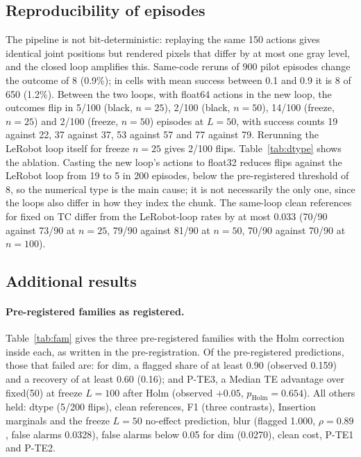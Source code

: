 \documentclass[11pt]{article}
\newcommand{\fixed}{\textsf{fixed}\xspace}
\begin{document}
\subsection{Reproducibility of episodes}\label{app:noise}
The pipeline is not bit-deterministic: replaying the same 150 actions gives identical joint positions but rendered pixels that differ by at most one gray level, and the closed loop amplifies this. Same-code reruns of 900 pilot episodes change the outcome of 8 (0.9\%); in cells with mean success between 0.1 and 0.9 it is 8 of 650 (1.2\%). Between the two loops, with float64 actions in the new loop, the outcomes flip in 5/100 (black, $n{=}25$), 2/100 (black, $n{=}50$), 14/100 (freeze, $n{=}25$) and 2/100 (freeze, $n{=}50$) episodes at $L{=}50$, with success counts 19 against 22, 37 against 37, 53 against 57 and 77 against 79. Rerunning the LeRobot loop itself for freeze $n{=}25$ gives 2/100 flips. Table~\ref{tab:dtype} shows the ablation. Casting the new loop's actions to float32 reduces flips against the LeRobot loop from 19 to 5 in 200 episodes, below the pre-registered threshold of 8, so the numerical type is the main cause; it is not necessarily the only one, since the loops also differ in how they index the chunk. The same-loop clean references for \fixed on TC differ from the LeRobot-loop rates by at most 0.033 (70/90 against 73/90 at $n{=}25$, 79/90 against 81/90 at $n{=}50$, 70/90 against 70/90 at $n{=}100$).
\begin{table}[h]
\centering\small

\caption{dtype ablation, TC, $n{=}25$, $L{=}50$, seeds 0--99. Flips are counted against the LeRobot loop (``run\_grid'') except the last column.}
\label{tab:dtype}
\end{table}

\subsection{Additional results}\label{app:extra}
\paragraph{Pre-registered families as registered.} Table~\ref{tab:fam} gives the three pre-registered families with the Holm correction inside each, as written in the pre-registration. Of the pre-registered predictions, those that failed are: for dim, a flagged share of at least 0.90 (observed 0.159) and a recovery of at least 0.60 (0.16); and P-TE3, a Median TE advantage over \fixed(50) at freeze $L{=}100$ after Holm (observed $+0.05$, $p_{\mathrm{Holm}}=0.654$). All others held: dtype (5/200 flips), clean references, F1 (three contrasts), Insertion marginals and the freeze $L{=}50$ no-effect prediction, blur (flagged 1.000, $\rho=0.89$, false alarms 0.0328), false alarms below 0.05 for dim (0.0270), clean cost, P-TE1 and P-TE2.
\begin{table}[h]
\centering\small

\caption{Pre-registered families F1--F3, in the wording of the pre-registration, where ``oracle'' is hold and ``TE'' is Median TE; $p_{\mathrm{Holm}}$ is within the family.}
\label{tab:fam}
\end{table}
\end{document}

